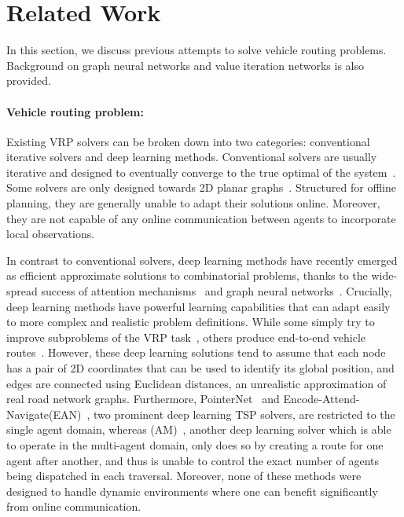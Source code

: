 \section{Related Work}

In this section, we discuss previous attempts to solve vehicle routing problems. Background on
graph neural networks and value iteration networks is also
provided.

\paragraph{Vehicle routing problem:}

Existing VRP solvers can be broken down into two categories: conventional iterative solvers and deep
learning methods. Conventional solvers are usually iterative and designed to eventually converge to
the true optimal of the system~\citep{concorde, branchandcut,lkh3}.  Some solvers are only designed
towards 2D planar graphs~\citep{spreadsheetvrp, gavrp, ilpvrp}. Structured for offline planning,
they are generally  unable to adapt their solutions online. Moreover, they are not capable of any
online communication between agents to incorporate local observations.

In contrast to conventional solvers, deep learning methods have recently emerged as efficient
approximate solutions to combinatorial problems, thanks to the wide-spread success of attention
mechanisms~\citep{pointer,transformer} and graph neural networks~\citep{gcn,combinatorialgraph}.
Crucially, deep learning methods have powerful learning capabilities that can adapt easily to more
complex and realistic problem definitions. While some simply try to improve subproblems of the VRP
task~\citep{marl,coopmasvrp, masterslave}, others produce  end-to-end vehicle routes~\citep{am,
ean}. However, these deep learning solutions tend to assume that each node has a pair of 2D
coordinates that can be used to identify its global position, and edges are connected using
Euclidean distances, an unrealistic approximation of real road network graphs.
Furthermore, PointerNet~\citep{pointer,onlineroutenn} and Encode-Attend-Navigate(EAN)~\citep{ean},
two prominent deep learning TSP solvers, are restricted to the single agent domain, whereas
(AM)~\citep{am}, another deep learning solver which is able to operate in the multi-agent domain,
only does so by creating a route for one agent after another, and thus is unable to control the
exact number of agents being dispatched in each traversal. %
Moreover, none of these methods were designed
to handle dynamic environments where one can benefit significantly from online communication.

